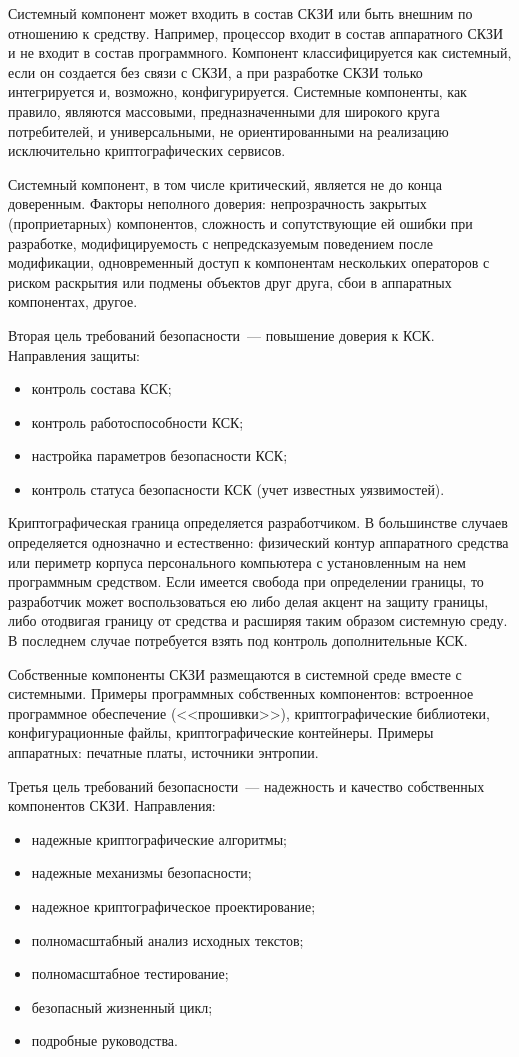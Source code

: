 Системный компонент может входить в состав СКЗИ или быть внешним по отношению
к средству. Например, процессор входит в состав аппаратного СКЗИ и не входит в 
состав программного. 
%
Компонент классифицируется как системный, если он создается без связи с 
СКЗИ, а при разработке СКЗИ только интегрируется и, возможно, конфигурируется.
%
Системные компоненты, как правило, являются массовыми, предназначенными для 
широкого круга потребителей, и универсальными, не ориентированными на 
реализацию исключительно криптографических сервисов.

Системный компонент, в том числе критический, является не до конца доверенным. 
% 
Факторы неполного доверия:
%
непрозрачность закрытых (проприетарных) компонентов,
%
сложность и сопутствующие ей ошибки при разработке,
%
модифицируемость с непредсказуемым поведением после модификации,
%
одновременный доступ к компонентам нескольких операторов с риском раскрытия или 
подмены объектов друг друга,
%
сбои в аппаратных компонентах,
%
другое.

Вторая цель требований безопасности~--- повышение доверия к КСК. 
Направления защиты:
\begin{itemize}
\item
контроль состава КСК;
\item
контроль работоспособности КСК;
\item
настройка параметров безопасности КСК;
\item
контроль статуса безопасности КСК (учет известных уязвимостей).
\end{itemize}

Криптографическая граница определяется разработчиком.
В большинстве случаев определяется однозначно и естественно:  
физический контур аппаратного средства или периметр корпуса персонального 
компьютера с установленным на нем программным средством.
%
Если имеется свобода при определении границы, то разработчик может
воспользоваться ею либо делая акцент на защиту границы, либо 
отодвигая границу от средства и расширяя таким образом системную среду. 
В последнем случае потребуется взять под контроль дополнительные КСК.

Собственные компоненты СКЗИ размещаются в системной среде вместе с системными.
Примеры программных собственных компонентов: 
встроенное программное обеспечение (<<прошивки>>),
криптографические библиотеки, конфигурационные файлы, криптографические 
контейнеры.
%
Примеры аппаратных: печатные платы, источники энтропии.

Третья цель требований безопасности~--- надежность и качество собственных 
компонентов СКЗИ.
%
Направления:
\begin{itemize}
\item 
надежные криптографические алгоритмы;
\item 
надежные механизмы безопасности;
\item 
надежное криптографическое проектирование;
\item 
полномасштабный анализ исходных текстов;
\item 
полномасштабное тестирование;
\item 
безопасный жизненный цикл;
\item 
подробные руководства.
\end{itemize}
